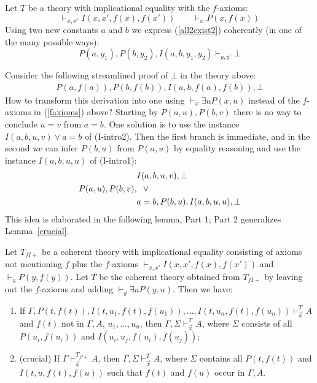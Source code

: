 \documentclass{fundam}
\begin{document}
\begin{example}\label{exa:counter2CL}
Let $T$  be a theory with implicational equality with the $f$-axioms:
\begin{equation}\label{faxioms}
\vdash_{x,x'} I(x,x',f(x),f(x') )\quad\quad \vdash_{x} P(x,f(x))
\end{equation}
Using two new constants $a$ and $b$ we express (\ref{all2exist2}) coherently
(in one of the many possible ways):
\[
P(a,y_1),P(b,y_2),I(a,b,y_1,y_2)  \vdash_{y,y'} \bot
\]

Consider the following streamlined proof of $\bot$ in the theory above:
\begin{align*}
P(a,f(a)), P(b,f(b)),I(a,b,f(a),f(b)),\bot
\end{align*}
How to transform this derivation into one using 
$\vdash_{x} \exists u P(x,u)$ instead of the $f$-axioms 
in (\ref{faxioms}) above? Starting by $P(a,u), P(b,v)$
there is no way to conclude $u=v$ from $a=b$.
One solution is to use the instance $I(a,b,u,v) \lor a=b$ of (I-intro2).
Then the first branch is immediate, and in the second
we can infer $P(b,u)$ from $P(a,u)$ by equality reasoning and use 
the instance $I(a,b,u,u)$ of (I-intro1):
\begin{align*}
&I(a,b,u,v),\bot\\
P(a,u),P(b,v),&{\hphantom w}\lor\\
& a=b,P(b,u),I(a,b,u,u),\bot\\
\end{align*}
This idea is elaborated in the following lemma, Part 1;
Part 2 generalizes Lemma~\ref{crucial}.
\end{example}




\begin{lemma}\label{lem:main}
Let $T_{f\!I\!{+}}$ be a coherent theory with implicational equality consisting of
axioms not mentioning $f$ plus the $f$-axioms $\vdash_{x,x'} I(x,x',f(x),f(x'))$
and $\vdash_{{y}} P({y},f({y}))$. Let $T$ be the coherent theory obtained from 
$T_{f\!I\!{+}}$ by leaving out the $f$-axioms and adding $\vdash_{{y}} \exists u P({y},u)$.
Then we have:
\begin{enumerate}
\item If $\Gamma,P(t,f(t)), I(t,u_1,f(t),f(u_1)),\ldots,I(t,u_n,f(t),f(u_n))\vdash_{\vec{x}}^{T} A$
and $f(t)$ not in $\Gamma,A$, $u_1,\ldots,u_n$, then  
$\Gamma,\Sigma\vdash_{\vec{x}}^{T} A$, where $\Sigma$ consists of 
all $P(u_i,f(u_i))$ and $I(u_i,u_j,f(u_i),f(u_j))$;
\item (crucial) If $\Gamma\vdash_{\vec{x}}^{T_{f\!I\!{+}}} A$, 
then $\Gamma,\Sigma\vdash_{\vec{x}}^{T} A$,
where $\Sigma$ contains all $P(t,f(t))$ and
$I(t,u,f(t),f(u))$ such that $f(t)$ and $f(u)$ occur in $\Gamma,A$.
\end{enumerate}
\end{lemma}
\end{document}
